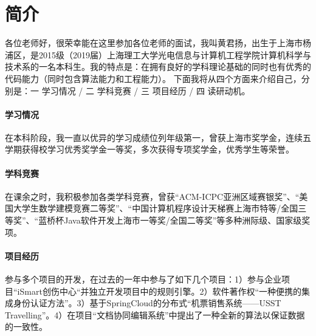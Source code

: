 \documentclass[letterpaper]{article}
\begin{document}

\section{简介}

各位老师好，很荣幸能在这里参加各位老师的面试，我叫黄君扬，出生于上海市杨浦区，是2015级（2019届）上海理工大学光电信息与计算机工程学院计算机科学与技术系的一名本科生。我的特点是：在拥有良好的学科理论基础的同时也有优秀的代码能力（同时包含算法能力和工程能力）。
下面我将从四个方面来介绍自己，分别是：一 学习情况 / 二 学科竞赛 / 三 项目经历 / 四 读研动机。

\paragraph{学习情况}
在本科阶段，我一直以优异的学习成绩位列年级第一，曾获上海市奖学金，连续五学期获得校学习优秀奖学金一等奖，多次获得专项奖学金，优秀学生等荣誉。

\paragraph{学科竞赛}
在课余之时，我积极参加各类学科竞赛，曾获“ACM-ICPC亚洲区域赛银奖”、“美国大学生数学建模竞赛二等奖”、“中国计算机程序设计天梯赛上海市特等/全国三等奖”、“蓝桥杯Java软件开发上海市一等奖/全国二等奖”等多种洲际级、国家级奖项。

\paragraph{项目经历}
参与多个项目的开发，在过去的一年中参与了如下几个项目：1）参与企业项目“iSmart创伤中心“并独立开发项目中的规则引擎。2）软件著作权“一种便携的集成身份认证方法”。3）基于SpringCloud的分布式“机票销售系统——USST Travelling”。4）在项目“文档协同编辑系统”中提出了一种全新的算法以保证数据的一致性。
\end{document}
